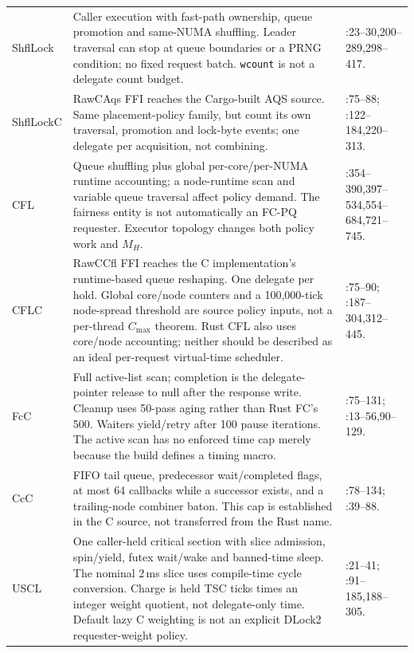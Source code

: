 \begin{longtable}{@{}P{0.14\textwidth}P{0.51\textwidth}P{0.27\textwidth}@{}}
\addlinespace
ShflLock & Caller execution with fast-path ownership, queue promotion and same-NUMA shuffling. Leader traversal can stop at queue boundaries or a PRNG condition; no fixed request batch. \texttt{wcount} is not a delegate count budget. & :23--30,200--289,298--417. \\
\addlinespace
ShflLockC & RawCAqs FFI reaches the Cargo-built AQS source. Same placement-policy family, but count its own traversal, promotion and lock-byte events; one delegate per acquisition, not combining. & :75--88; :122--184,220--313. \\
\addlinespace
CFL & Queue shuffling plus global per-core/per-NUMA runtime accounting; a node-runtime scan and variable queue traversal affect policy demand. The fairness entity is not automatically an FC-PQ requester. Executor topology changes both policy work and $M_H$. & :354--390,397--534,554--684,721--745. \\
\addlinespace
CFLC & RawCCfl FFI reaches the C implementation's runtime-based queue reshaping. One delegate per hold. Global core/node counters and a 100,000-tick node-spread threshold are source policy inputs, not a per-thread $C_{\max}$ theorem. Rust CFL also uses core/node accounting; neither should be described as an ideal per-request virtual-time scheduler. & :75--90; :187--304,312--445. \\
\addlinespace
FcC & Full active-list scan; completion is the delegate-pointer release to null after the response write. Cleanup uses 50-pass aging rather than Rust FC's 500. Waiters yield/retry after 100 pause iterations. The active scan has no enforced time cap merely because the build defines a timing macro. & :75--131; :13--56,90--129. \\
\addlinespace
CcC & FIFO tail queue, predecessor wait/completed flags, at most 64 callbacks while a successor exists, and a trailing-node combiner baton. This cap is established in the C source, not transferred from the Rust name. & :78--134; :39--88. \\
\addlinespace
USCL & One caller-held critical section with slice admission, spin/yield, futex wait/wake and banned-time sleep. The nominal 2\,ms slice uses compile-time cycle conversion. Charge is held TSC ticks times an integer weight quotient, not delegate-only time. Default lazy C weighting is not an explicit DLock2 requester-weight policy. & :21--41; :91--185,188--305. \\
\end{longtable}
\normalsize

